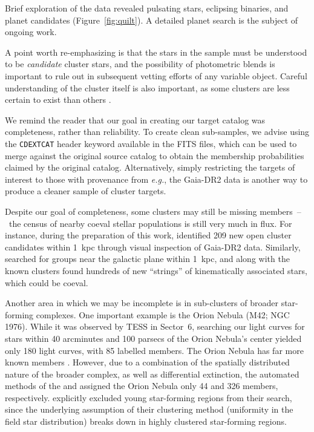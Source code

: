 \documentclass[12pt,twocolumn,tighten]{aastex62}
\begin{document}
Brief exploration of the data revealed pulsating stars, eclipsing
binaries, and planet candidates (Figure~\ref{fig:quilt}).  A detailed
planet search is the subject of ongoing work.

A point worth re-emphasizing is that the stars in the sample must be
understood to be {\it candidate} cluster stars, and the possibility of
photometric blends is important to rule out in subsequent vetting
efforts of any variable object.  Careful understanding of the cluster
itself is also important, as some clusters are less certain to exist
than others \citep[{\it e.g.}, the infra-red clusters identified
by][]{froebrich_FSR_2007}.

We remind the reader that our goal in creating our target catalog was
completeness, rather than reliability.  To create clean sub-samples,
we advise using the \texttt{CDEXTCAT} header keyword available in the
FITS files, which can be used to merge against the original source
catalog to obtain the membership probabilities claimed by the original
catalog.  Alternatively, simply restricting the targets of interest to
those with provenance from {\it e.g.}, the Gaia-DR2 data is another
way to produce a cleaner sample of cluster targets.

Despite our goal of completeness, some clusters may still be missing
members~--~the census of nearby coeval stellar populations is still
very much in flux. For instance, during the preparation of this work,
\citet{sim_open_2019} identified 209 new open cluster candidates
within 1~kpc through visual inspection of Gaia-DR2 data.  Similarly,
\citet{kounkel_untangling_2019} searched for groups near the galactic
plane within 1~kpc, and along with the known clusters found hundreds
of new ``strings'' of kinematically associated stars, which could be
coeval.

Another area in which we may be incomplete is in sub-clusters of
broader star-forming complexes. One important example is the Orion
Nebula (M42; NGC 1976).  While it was observed by TESS in Sector~6,
searching our light curves for stars within 40 arcminutes and 100
parsecs of the Orion Nebula's center yielded only 180 light curves,
with 85 labelled members.  The Orion Nebula has far more known members
\citep{jones_proper_1988}.  However, due to a combination of the
spatially distributed nature of the broader complex, as well as
differential extinction, the automated methods of the
\citet{Kharchenko_et_al_2013} and \citet{dias_proper_2014} assigned
the Orion Nebula only 44 and 326 members, respectively.
\citet{cantat-gaudin_gaia_2018} explicitly excluded young star-forming
regions from their search, since the underlying assumption of their
clustering method (uniformity in the field star distribution) breaks
down in highly clustered star-forming regions.
\end{document}
